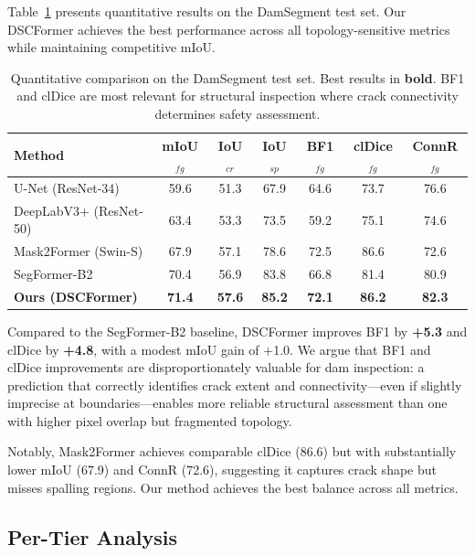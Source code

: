 \documentclass[10pt,twocolumn,letterpaper]{article}
\begin{document}
Table~\ref{tab:main} presents quantitative results on the DamSegment test set. Our DSCFormer achieves the best performance across all topology-sensitive metrics while maintaining competitive mIoU.

\begin{table}[t]
\centering
\caption{Quantitative comparison on the DamSegment test set. Best results in \textbf{bold}. BF1 and clDice are most relevant for structural inspection where crack connectivity determines safety assessment.}
\label{tab:main}
\begin{tabular}{lcccccc}
\toprule
Method & mIoU$_{fg}$ & IoU$_{cr}$ & IoU$_{sp}$ & BF1$_{fg}$ & clDice$_{fg}$ & ConnR$_{fg}$ \\
\midrule
U-Net (ResNet-34) & 59.6 & 51.3 & 67.9 & 64.6 & 73.7 & 76.6 \\
DeepLabV3+ (ResNet-50) & 63.4 & 53.3 & 73.5 & 59.2 & 75.1 & 74.6 \\
Mask2Former (Swin-S) & 67.9 & 57.1 & 78.6 & 72.5 & 86.6 & 72.6 \\
SegFormer-B2 & 70.4 & 56.9 & 83.8 & 66.8 & 81.4 & 80.9 \\
\midrule
\textbf{Ours (DSCFormer)} & \textbf{71.4} & \textbf{57.6} & \textbf{85.2} & \textbf{72.1} & \textbf{86.2} & \textbf{82.3} \\
\bottomrule
\end{tabular}
\end{table}

Compared to the SegFormer-B2 baseline, DSCFormer improves BF1 by \textbf{+5.3} and clDice by \textbf{+4.8}, with a modest mIoU gain of +1.0. We argue that BF1 and clDice improvements are disproportionately valuable for dam inspection: a prediction that correctly identifies crack extent and connectivity---even if slightly imprecise at boundaries---enables more reliable structural assessment than one with higher pixel overlap but fragmented topology.

Notably, Mask2Former achieves comparable clDice (86.6) but with substantially lower mIoU (67.9) and ConnR (72.6), suggesting it captures crack shape but misses spalling regions. Our method achieves the best balance across all metrics.

\subsection{Per-Tier Analysis}
\end{document}
